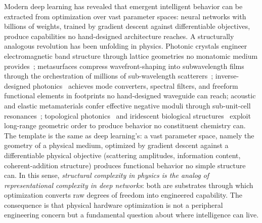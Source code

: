 \documentclass[11pt,a4paper,onecolumn]{article}
\begin{document}
Modern deep learning has revealed that emergent intelligent behavior can be extracted from optimization over vast parameter spaces: neural networks with billions of weights, trained by gradient descent against differentiable objectives, produce capabilities no hand-designed architecture reaches.  A structurally analogous revolution has been unfolding in physics.  Photonic crystals engineer electromagnetic band structure through lattice geometries no monatomic medium provides~\cite{joannopoulos2008photonic}; metasurfaces compress wavefront-shaping into subwavelength films through the orchestration of millions of sub-wavelength scatterers~\cite{yu2014flat}; inverse-designed photonics~\cite{molesky2018inverse, jensen2011topology, fan2020freeform, christiansen2021fullwave,lin2018topology} achieves mode converters, spectral filters, and freeform functional elements in footprints no hand-designed waveguide can reach; acoustic and elastic metamaterials confer effective negative moduli through sub-unit-cell resonances~\cite{cummer2016controlling}; topological photonics~\cite{ozawa2019topological} and iridescent biological structures~\cite{vukusic2003photonic} exploit long-range geometric order to produce behavior no constituent chemistry can.  The template is the same as deep learning's: a vast parameter space, namely the geometry of a physical medium, optimized by gradient descent against a differentiable physical objective (scattering amplitudes, information content, coherent-addition structure) produces functional behavior no simple structure can.  In this sense, \emph{structural complexity in physics is the analog of representational complexity in deep networks}: both are substrates through which optimization converts raw degrees of freedom into engineered capability.  The consequence is that physical hardware optimization is not a peripheral engineering concern but a fundamental question about where intelligence can live.
\end{document}
